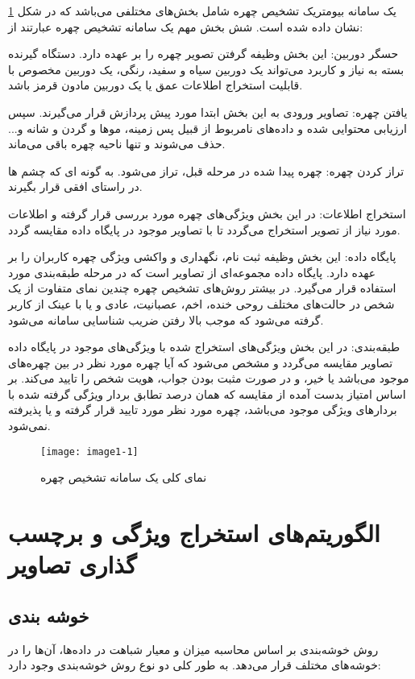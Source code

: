 یک سامانه بیومتریک تشخیص چهره شامل بخش‌های مختلفی می‌باشد که در شکل \ref{image1-1} نشان داده شده است. شش بخش مهم یک سامانه تشخیص چهره عبارتند از:

\noindent
حسگر دوربین: این بخش وظیفه گرفتن تصویر چهره را بر عهده دارد. دستگاه گیرنده بسته به نیاز و کاربرد می‌تواند یک دوربین سیاه و سفید، رنگی، یک دوربین مخصوص با قابلیت استخراج اطلاعات عمق یا یک دوربین مادون قرمز باشد.

\noindent
یافتن چهره: تصاویر ورودی به این بخش ابتدا مورد پیش پردازش قرار می‌گیرند. سپس ارزیابی محتوایی شده و داده‌های نامربوط از قبیل پس زمینه، موها و گردن و شانه و... حذف می‌شوند و تنها ناحیه چهره باقی می‌ماند.

\noindent
تراز کردن چهره: چهره پیدا شده در مرحله قبل، تراز می‌شود. به گونه ای که چشم ها در راستای افقی قرار بگیرند.

\noindent
استخراج اطلاعات: در این بخش ویژگی‌های چهره مورد بررسی قرار گرفته و اطلاعات مورد نیاز از تصویر استخراج می‌گردد تا با تصاویر موجود در پایگاه داده مقایسه گردد.

\noindent
پایگاه داده: این بخش وظیفه ثبت نام، نگهداری و واکشی ویژگی چهره کاربران را بر عهده دارد. پایگاه داده مجموعه‌ای از تصاویر است که در مرحله طبقه‌بندی مورد استفاده قرار می‌گیرد. در بیشتر روش‌های تشخیص چهره چندین نمای متفاوت از یک شخص در حالت‌های مختلف روحی خنده، اخم، عصبانیت، عادی و یا با عینک از کاربر گرفته می‌شود که موجب بالا رفتن ضریب شناسایی سامانه می‌شود.

\noindent
طبقه‌بندی: در این بخش ویژگی‌های استخراج شده با ویژگی‌های موجود در پایگاه داده تصاویر مقایسه می‌گردد و مشخص می‌شود که آیا چهره مورد نظر در بین چهره‌های موجود می‌باشد یا خیر، و در صورت مثبت بودن جواب، هویت شخص را تایید می‌کند. بر اساس امتیاز بدست آمده از مقایسه که همان درصد تطابق بردار ویژگی گرفته شده با بردارهای ویژگی موجود می‌باشد، چهره مورد نظر مورد تایید قرار گرفته و یا پذیرفته نمی‌شود.

\begin{figure}[!h]
\centering
\texttt{[image: image1-1]}
\caption{نمای کلی یک سامانه تشخیص چهره}
\label{image1-1}
\end{figure}

\section{ الگوریتم‌های استخراج ویژگی و برچسب گذاری تصاویر }

\subsection{ خوشه بندی }
روش خوشه‌بندی  بر اساس محاسبه میزان و معیار شباهت در داده‌ها، آن‌ها را در خوشه‌های مختلف قرار می‌دهد. به طور کلی دو نوع روش خوشه‌بندی وجود دارد:

